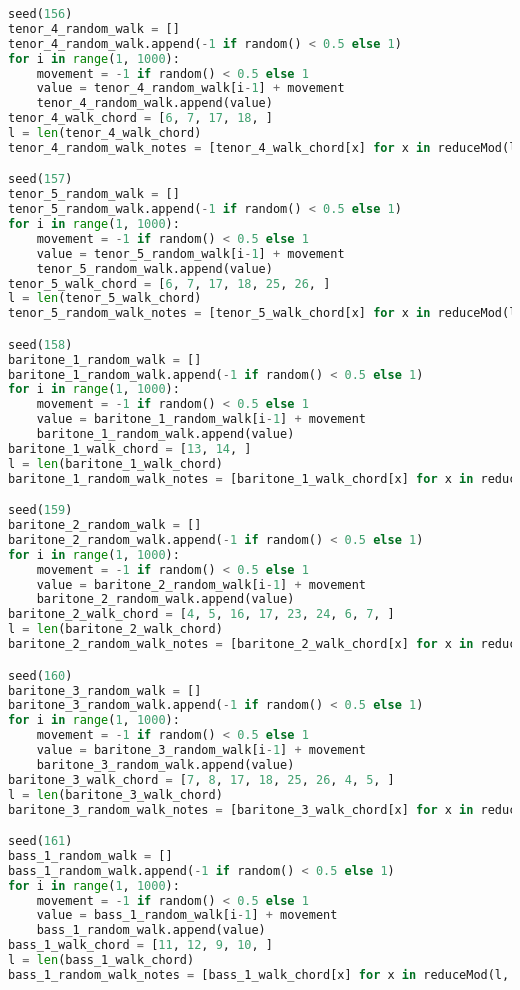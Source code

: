 \begin{lstlisting}[language=Python, caption=Invocation Source Code]
seed(156)
tenor_4_random_walk = []
tenor_4_random_walk.append(-1 if random() < 0.5 else 1)
for i in range(1, 1000):
    movement = -1 if random() < 0.5 else 1
    value = tenor_4_random_walk[i-1] + movement
    tenor_4_random_walk.append(value)
tenor_4_walk_chord = [6, 7, 17, 18, ]
l = len(tenor_4_walk_chord)
tenor_4_random_walk_notes = [tenor_4_walk_chord[x] for x in reduceMod(l, tenor_4_random_walk)]

seed(157)
tenor_5_random_walk = []
tenor_5_random_walk.append(-1 if random() < 0.5 else 1)
for i in range(1, 1000):
    movement = -1 if random() < 0.5 else 1
    value = tenor_5_random_walk[i-1] + movement
    tenor_5_random_walk.append(value)
tenor_5_walk_chord = [6, 7, 17, 18, 25, 26, ]
l = len(tenor_5_walk_chord)
tenor_5_random_walk_notes = [tenor_5_walk_chord[x] for x in reduceMod(l, tenor_5_random_walk)]

seed(158)
baritone_1_random_walk = []
baritone_1_random_walk.append(-1 if random() < 0.5 else 1)
for i in range(1, 1000):
    movement = -1 if random() < 0.5 else 1
    value = baritone_1_random_walk[i-1] + movement
    baritone_1_random_walk.append(value)
baritone_1_walk_chord = [13, 14, ]
l = len(baritone_1_walk_chord)
baritone_1_random_walk_notes = [baritone_1_walk_chord[x] for x in reduceMod(l, baritone_1_random_walk)]

seed(159)
baritone_2_random_walk = []
baritone_2_random_walk.append(-1 if random() < 0.5 else 1)
for i in range(1, 1000):
    movement = -1 if random() < 0.5 else 1
    value = baritone_2_random_walk[i-1] + movement
    baritone_2_random_walk.append(value)
baritone_2_walk_chord = [4, 5, 16, 17, 23, 24, 6, 7, ]
l = len(baritone_2_walk_chord)
baritone_2_random_walk_notes = [baritone_2_walk_chord[x] for x in reduceMod(l, baritone_2_random_walk)]

seed(160)
baritone_3_random_walk = []
baritone_3_random_walk.append(-1 if random() < 0.5 else 1)
for i in range(1, 1000):
    movement = -1 if random() < 0.5 else 1
    value = baritone_3_random_walk[i-1] + movement
    baritone_3_random_walk.append(value)
baritone_3_walk_chord = [7, 8, 17, 18, 25, 26, 4, 5, ]
l = len(baritone_3_walk_chord)
baritone_3_random_walk_notes = [baritone_3_walk_chord[x] for x in reduceMod(l, baritone_3_random_walk)]

seed(161)
bass_1_random_walk = []
bass_1_random_walk.append(-1 if random() < 0.5 else 1)
for i in range(1, 1000):
    movement = -1 if random() < 0.5 else 1
    value = bass_1_random_walk[i-1] + movement
    bass_1_random_walk.append(value)
bass_1_walk_chord = [11, 12, 9, 10, ]
l = len(bass_1_walk_chord)
bass_1_random_walk_notes = [bass_1_walk_chord[x] for x in reduceMod(l, bass_1_random_walk)]


\end{lstlisting}
